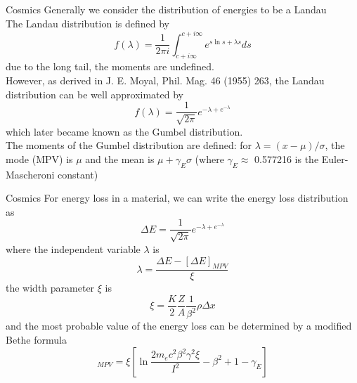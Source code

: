 \documentclass[compress,8pt]{beamer} %
\begin{document}
\begin{frame}{Cosmics}
Generally we consider the distribution of energies to be a Landau \\
The Landau distribution is defined by
\begin{equation*}
f(\lambda) = \frac{1}{2\pi i} \int_{c+i\infty}^{c+i\infty} e^{s \ln s + \lambda s} ds
\end{equation*}
due to the long tail, the moments are undefined. \\
\vspace{10pt}
However, as derived in  J. E. Moyal, Phil. Mag. 46 (1955) 263, the Landau distribution can be well approximated by
\begin{equation*}
f(\lambda) = \frac{1}{\sqrt{2\pi}} e^{-\lambda+e^{-\lambda}}
\end{equation*}
which later became known as the Gumbel distribution. \\
The moments of the Gumbel distribution are defined:
for $\lambda = (x-\mu)/\sigma$, the mode (MPV) is $\mu$ and the mean is $\mu + \gamma_E\sigma$
(where $\gamma_E \approx$ 0.577216 is the Euler-Mascheroni constant)
\end{frame}



\begin{frame}{Cosmics}
For energy loss in a material, we can write the energy loss distribution as
\begin{equation*}
\Delta E = \frac{1}{\sqrt{2\pi}} e^{-\lambda+e^{-\lambda}}
\end{equation*}
where the independent variable $\lambda$ is
\begin{equation*}
\lambda = \frac{\Delta E - [\Delta E]_{MPV}}{\xi}
\end{equation*}
the width parameter $\xi$ is
\begin{equation*}
\xi =  \frac{K}{2}\frac{Z}{A}\frac{1}{\beta^2}\rho\Delta x
\end{equation*}
and the most probable value of the energy loss can be determined by a modified Bethe formula
\begin{equation*}
[\Delta E]_{MPV} = \xi \left[ \ln \frac{2m_ec^2\beta^2\gamma^2\xi}{I^2} -\beta^2 + 1 -\gamma_E \right]
\end{equation*}
\end{frame}
\end{document}
